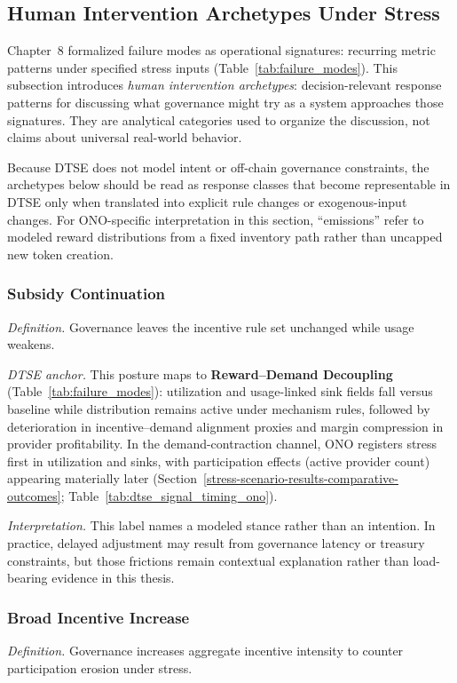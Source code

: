 \subsection{Human Intervention Archetypes Under Stress}
Chapter~8 formalized failure modes as operational signatures: recurring metric patterns under specified stress inputs (Table~\ref{tab:failure_modes}). This subsection introduces \emph{human intervention archetypes}: decision-relevant response patterns for discussing what governance might try as a system approaches those signatures. They are analytical categories used to organize the discussion, not claims about universal real-world behavior.

Because DTSE does not model intent or off-chain governance constraints, the archetypes below should be read as response classes that become representable in DTSE only when translated into explicit rule changes or exogenous-input changes. For ONO-specific interpretation in this section, ``emissions'' refer to modeled reward distributions from a fixed inventory path rather than uncapped new token creation.

\subsubsection*{Subsidy Continuation}
\emph{Definition.} Governance leaves the incentive rule set unchanged while usage weakens.

\emph{DTSE anchor.} This posture maps to \textbf{Reward--Demand Decoupling} (Table~\ref{tab:failure_modes}): utilization and usage-linked sink fields fall versus baseline while distribution remains active under mechanism rules, followed by deterioration in incentive--demand alignment proxies and margin compression in provider profitability. In the demand-contraction channel, ONO registers stress first in utilization and sinks, with participation effects (active provider count) appearing materially later (Section~\ref{stress-scenario-results-comparative-outcomes}; Table~\ref{tab:dtse_signal_timing_ono}).

\emph{Interpretation.} This label names a modeled stance rather than an intention. In practice, delayed adjustment may result from governance latency or treasury constraints, but those frictions remain contextual explanation rather than load-bearing evidence in this thesis.

\subsubsection*{Broad Incentive Increase}
\emph{Definition.} Governance increases aggregate incentive intensity to counter participation erosion under stress.

